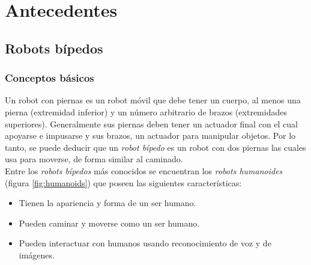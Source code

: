 \documentclass{book}
\begin{document}
\chapter{Antecedentes}
\section{Robots bípedos}
\subsection{Conceptos básicos}
Un robot con piernas es un robot móvil que debe tener un cuerpo, al menos una pierna (extremidad inferior) y un número arbitrario de brazos (extremidades superiores). Generalmente sus piernas deben tener un actuador final con el cual apoyarse e impusarse  y sus brazos, un actuador para manipular objetos\cite{siciliano2016springer}. Por lo tanto, se puede deducir que un \textit{robot bípedo} es un robot con dos piernas las cuales usa para moverse, de forma similar al caminado.
\\

Entre los \textit{robots bípedos} más conocidos se encuentran los \textit{robots humanoides} (figura \ref{fig:humanoids}) que poseen las siguientes características:

\begin{itemize}
\item Tienen la apariencia y forma de un ser humano.
\item Pueden caminar y moverse como un ser humano.
\item Pueden interactuar con humanos usando reconocimiento de voz y de imágenes.
\end{itemize}
\end{document}
